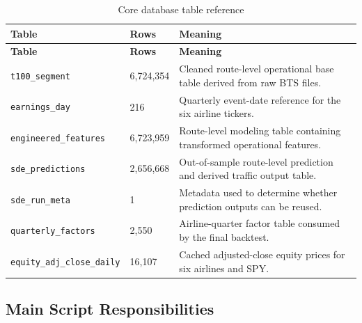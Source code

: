 \documentclass[11pt,a4paper]{article}
\begin{document}
\begin{longtable}{p{3.2cm} p{2.0cm} p{8.9cm}}
\caption{Core database table reference}\label{tab:appendix_tables}\\
\toprule
\textbf{Table} & \textbf{Rows} & \textbf{Meaning} \\
\midrule
\endfirsthead
\toprule
\textbf{Table} & \textbf{Rows} & \textbf{Meaning} \\
\midrule
\endhead
\texttt{t100\_segment} & 6,724,354 & Cleaned route-level operational base table derived from raw BTS files. \\
\texttt{earnings\_day} & 216 & Quarterly event-date reference for the six airline tickers. \\
\texttt{engineered\_features} & 6,723,959 & Route-level modeling table containing transformed operational features. \\
\texttt{sde\_predictions} & 2,656,668 & Out-of-sample route-level prediction and derived traffic output table. \\
\texttt{sde\_run\_meta} & 1 & Metadata used to determine whether prediction outputs can be reused. \\
\texttt{quarterly\_factors} & 2,550 & Airline-quarter factor table consumed by the final backtest. \\
\texttt{equity\_adj\_close\_daily} & 16,107 & Cached adjusted-close equity prices for six airlines and SPY. \\
\bottomrule
\end{longtable}

\subsection{Main Script Responsibilities}
\end{document}
